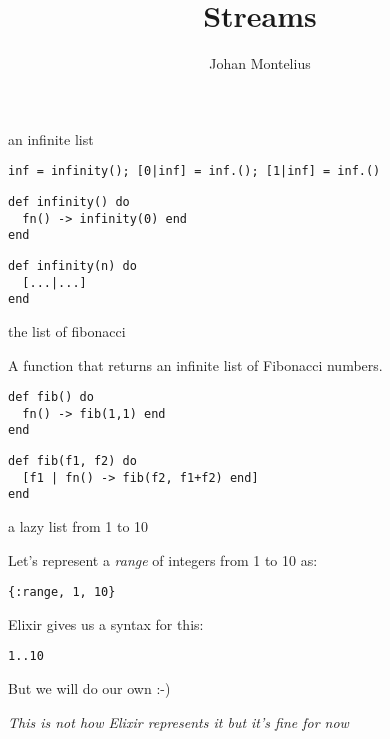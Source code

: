 

\title[ID1019 Streams]{Streams}

\author{Johan Montelius}
\date{\semester}



\begin{frame}
\titlepage
\end{frame}

\begin{frame}[fragile]{an infinite list}

\pause\vspace{20pt}

\verb+inf = infinity()+\pause \verb+; [0|inf] = inf.()+\pause \verb+; [1|inf] = inf.()+

\pause
\begin{verbatim}
def infinity() do 
  fn() -> infinity(0) end 
end
\end{verbatim}
\pause
\begin{verbatim}
def infinity(n) do
  [...|...] 
end
\end{verbatim}

\end{frame}


\begin{frame}[fragile]{the list of fibonacci }

A function that returns an infinite list of Fibonacci numbers.

\pause\vspace{20pt}

\begin{verbatim}
def fib() do 
  fn() -> fib(1,1) end 
end
\end{verbatim}
\pause
\begin{verbatim}
def fib(f1, f2) do
  [f1 | fn() -> fib(f2, f1+f2) end]
end
\end{verbatim}

\end{frame}

\begin{frame}{a lazy list from 1 to 10}

  Let's represent a {\em range} of integers from 1 to 10 as:

  \vspace{10pt}\hspace{20pt} {\tt \{:range, 1, 10\}}

  \vspace{10pt}\pause

  Elixir gives us a syntax for this:

    \vspace{10pt}\hspace{20pt} {\tt 1..10}

    \vspace{10pt}\pause
    But we will do our own :-)

    
  \vspace{40pt}\pause
  {\em This is not how Elixir represents it but it's fine for now}

\end{frame}

